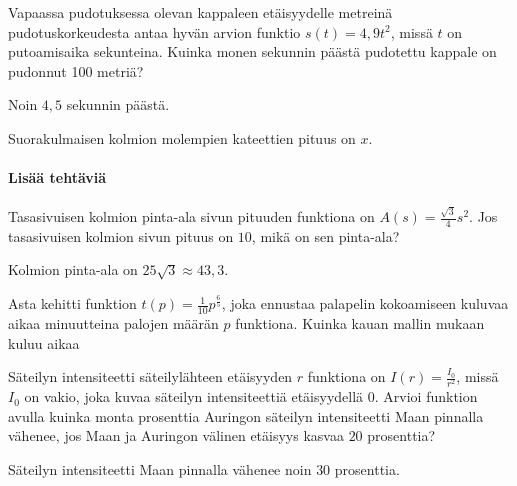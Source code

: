 \begin{tehtavasivu}
\begin{tehtava}
Vapaassa pudotuksessa olevan kappaleen etäisyydelle metreinä pudotuskorkeudesta antaa hyvän arvion funktio $ s(t)=4,9t^{2}$, missä $t$ on putoamisaika sekunteina. Kuinka monen sekunnin päästä pudotettu kappale on pudonnut 100 metriä?
\begin{vastaus}
Noin $4,5$ sekunnin päästä.
\end{vastaus}
\end{tehtava}

\begin{tehtava}
Suorakulmaisen kolmion molempien kateettien pituus on $x$.
\begin{vastaus}
\end{vastaus}
\end{tehtava}

\paragraph*{Lisää tehtäviä}

\begin{tehtava}
Tasasivuisen kolmion pinta-ala sivun pituuden funktiona on $A(s) = \frac{\sqrt{3}}{4}s^{2}$. Jos tasasivuisen kolmion sivun pituus on $10$, mikä on sen pinta-ala?
\begin{vastaus}
Kolmion pinta-ala on $25\sqrt{3}\approx43,3$.
\end{vastaus}
\end{tehtava}


\begin{tehtava}
Asta kehitti funktion $t(p)=\frac{1}{10}p^{\frac{6}{5}}$, joka ennustaa palapelin kokoamiseen kuluvaa aikaa minuutteina palojen määrän $p$ funktiona. Kuinka kauan mallin mukaan kuluu aikaa
\begin{vastaus}
\end{vastaus}
\end{tehtava}


\begin{tehtava}
Säteilyn intensiteetti säteilylähteen etäisyyden $r$ funktiona on $ I(r)=\frac{I_0}{r^{2}}$, missä $I_0$ on vakio, joka kuvaa säteilyn intensiteettiä etäisyydellä $0$. Arvioi funktion avulla kuinka monta prosenttia Auringon säteilyn intensiteetti Maan pinnalla vähenee, jos Maan ja Auringon välinen etäisyys kasvaa $20$ prosenttia?
\begin{vastaus}
Säteilyn intensiteetti Maan pinnalla vähenee noin $30$ prosenttia.
\end{vastaus}
\end{tehtava}


\end{tehtavasivu}
